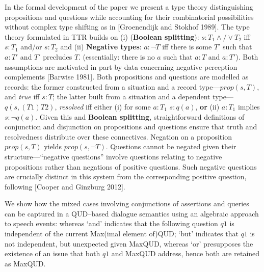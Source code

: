 \documentclass[12pt]{article}
\newcommand{\ignore}[1]{}
\begin{document}
\ignore{
1. TTR theory of ps and qs: conj, disj, and neg
2. KoS theory of speech act connectives (cite Krifka)
}
In the formal development of the paper we  present a type theory distinguishing
 propositions and questions while
 accounting for their combinatorial possibilities without complex type shifting as in [Groenendijk and Stokhof 1989]. The type theory formulated in TTR builds on (i)  ({\bf Boolean splitting}): $s : T_1 \wedge/\vee T_2$ iff $s :T_1$ and/or $s :T_2$  and (ii) {\bf Negative types}: $a:\neg T$ iff there is some $T'$ such that $a:T'$  and $T'$
precludes $T$. (essentially: there is no $a$ such that $a:T$ and $a:T'$).
   Both assumptions are motivated in part by data concerning negative perception complements [Barwise 1981]. Both propositions and questions are modelled as records:  the former constructed from a situation and a record type---$prop(s,T)$, and {\it true} iff $s : T$; the latter built from a situation and a dependent  type---$q(s,(T1)T2)$, {\it resolved} iff either (i) for some $a:T_1$  $s : q(a)$, \textbf{or} (ii) 
$a:T_1$ implies  $s : \neg q(a)$. Given this and {\bf Boolean splitting}, straightforward definitions of conjunction and disjunction on propositions and questions ensure that truth and resolvedness distribute over these connectives. Negation on a proposition $prop(s,T)$ yields  $prop(s,\neg T)$. Questions cannot be negated given their structure---``negative questions'' involve questions relating to negative propositions rather than negations of positive
questions. Such negative questions are crucially distinct in this system from the
corresponding positive question, following [Cooper and Ginzburg 2012].
 
 We  show how the mixed
cases involving conjunctions of assertions and queries can be captured in a
QUD--based dialogue semantics using an algebraic approach to speech
events: whereas `and' indicates that the following question $q1$ is
independent of the current  Max(imal element of)QUD; `but'
indicates that $q1$   is not
independent, but unexpected given MaxQUD, whereas `or'  presupposes
the existence of an issue   that both $q1$ 
and   MaxQUD address, hence both are retained as MaxQUD. 
\end{document}
